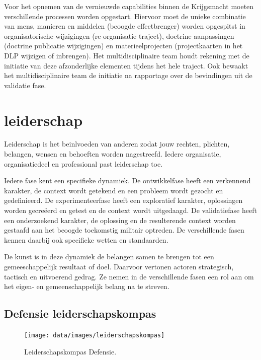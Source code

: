 \documentclass[
]{book}
\begin{document}
Voor het opnemen van de vernieuwde capabilities binnen de Krijgsmacht moeten verschillende processen worden opgestart. Hiervoor moet de unieke combinatie van mens, manieren en middelen (beoogde effectbrenger) worden opgespitst in organisatorische wijzigingen (re-organisatie traject), doctrine aanpassingen (doctrine publicatie wijzigingen) en materieelprojecten (projectkaarten in het DLP wijzigen of inbrengen). Het multidisciplinaire team houdt rekening met de initiatie van deze afzonderlijke elementen tijdens het hele traject. Ook bewaakt het multidisciplinaire team de initiatie na rapportage over de bevindingen uit de validatie fase.

\hypertarget{leiderschap}{%
\section{leiderschap}\label{leiderschap}}

Leiderschap is het beinlvoeden van anderen zodat jouw rechten, plichten, belangen, wensen en behoeften worden nagestreefd. Iedere organisatie, organisatiedeel en professional past leiderschap toe.

Iedere fase kent een specifieke dynamiek. De ontwikkelfase heeft een verkennend karakter, de context wordt getekend en een probleem wordt gezocht en gedefinieerd. De experimenteerfase heeft een exploratief karakter, oplossingen worden gecreëerd en getest en de context wordt uitgedaagd. De validatiefase heeft een onderzoekend karakter, de oplossing en de resulterende context worden gestaafd aan het beoogde toekomstig militair optreden. De verschillende fasen kennen daarbij ook specifieke wetten en standaarden.

De kunst is in deze dynamiek de belangen samen te brengen tot een gemeeschappelijk resultaat of doel. Daarvoor vertonen actoren strategisch, tactisch en uitvoerend gedrag. Ze nemen in de verschillende fasen een rol aan om het eigen- en gemeenschappelijk belang na te streven.

\hypertarget{defensie-leiderschapskompas}{%
\subsection{Defensie leiderschapskompas}\label{defensie-leiderschapskompas}}

\begin{figure}

{\centering \texttt{[image: data/images/leiderschapskompas]} 

}

\caption{Leiderschapskompas Defensie.}\label{fig:unnamed-chunk-12}
\end{figure}
\end{document}
